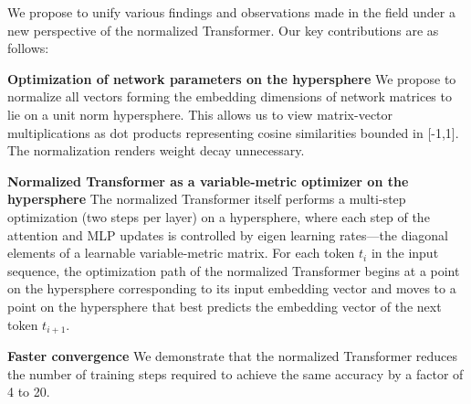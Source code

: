 \documentclass{article} %
\begin{document}
We propose to unify various findings and observations made in the field under a new perspective of the normalized Transformer. Our key contributions are as follows:
\begin{description}
    \item \textbf{Optimization of network parameters on the hypersphere} We propose to normalize all vectors forming the embedding dimensions of network matrices to lie on a unit norm hypersphere. This allows us to view matrix-vector multiplications as dot products representing cosine similarities bounded in [-1,1]. The  normalization renders weight decay unnecessary.
    \item \textbf{Normalized Transformer as a variable-metric optimizer on the hypersphere} The normalized Transformer itself performs a multi-step optimization (two steps per layer) on a hypersphere, where each step of the attention and MLP updates is controlled by {eigen} learning rates—the diagonal elements of a learnable variable-metric matrix. For each token $t_i$ in the input sequence, the optimization path of the normalized Transformer  begins at a point on the hypersphere corresponding to its input embedding vector and moves to a point on the hypersphere that best predicts the embedding vector of the next token $t_{i+1}$. 
    \item \textbf{Faster convergence} We demonstrate that the normalized Transformer reduces the number of training steps required to achieve the same accuracy by a factor of 4 to 20.%
\end{description}
\end{document}
